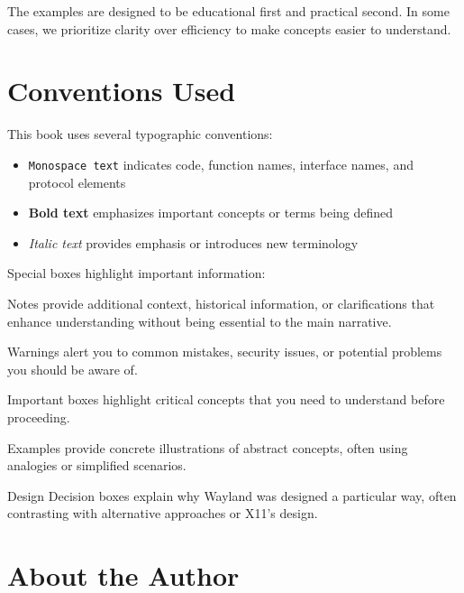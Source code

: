 The examples are designed to be educational first and practical second. In some cases, we prioritize clarity over efficiency to make concepts easier to understand.

\section*{Conventions Used}

This book uses several typographic conventions:

\begin{itemize}
    \item \texttt{Monospace text} indicates code, function names, interface names, and protocol elements
    \item \textbf{Bold text} emphasizes important concepts or terms being defined
    \item \textit{Italic text} provides emphasis or introduces new terminology
\end{itemize}

Special boxes highlight important information:

\begin{notebox}
Notes provide additional context, historical information, or clarifications that enhance understanding without being essential to the main narrative.
\end{notebox}

\begin{warningbox}
Warnings alert you to common mistakes, security issues, or potential problems you should be aware of.
\end{warningbox}

\begin{importantbox}
Important boxes highlight critical concepts that you need to understand before proceeding.
\end{importantbox}

\begin{examplebox}
Examples provide concrete illustrations of abstract concepts, often using analogies or simplified scenarios.
\end{examplebox}

\begin{designbox}
Design Decision boxes explain why Wayland was designed a particular way, often contrasting with alternative approaches or X11's design.
\end{designbox}

\section*{About the Author}

